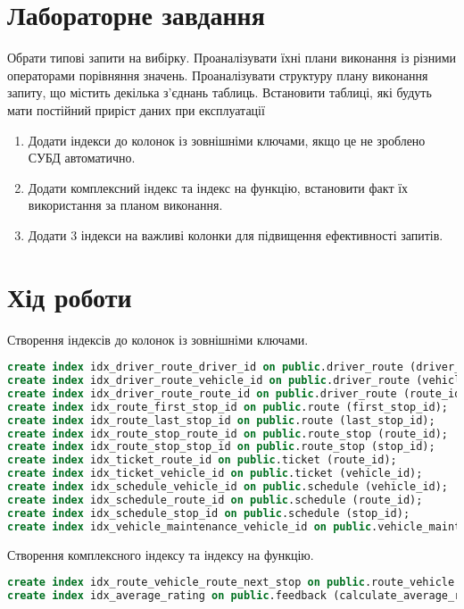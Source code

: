 \documentclass[14pt]{extreport}
\begin{document}
\begin{normalsize}
	\section*{Лабораторне завдання}
	Обрати типові запити на вибірку. Проаналізувати їхні плани виконання із різними операторами порівняння значень. Проаналізувати структуру плану виконання запиту, що містить декілька з’єднань таблиць. Встановити таблиці, які будуть мати постійний приріст даних при експлуатації
	
	\begin{enumerate}
\item Додати індекси до колонок із зовнішніми ключами, якщо це не зроблено СУБД автоматично.
\item Додати комплексний індекс та індекс на функцію, встановити факт їх використання за планом виконання.
\item Додати 3 індекси на важливі колонки для підвищення ефективності запитів.
	\end{enumerate}
	
	\section*{Хід роботи}
	
	Створення індексів до колонок із зовнішніми ключами.
	\begin{small}
		\begin{lstlisting}[language=sql]
create index idx_driver_route_driver_id on public.driver_route (driver_id);
create index idx_driver_route_vehicle_id on public.driver_route (vehicle_id);
create index idx_driver_route_route_id on public.driver_route (route_id);
create index idx_route_first_stop_id on public.route (first_stop_id);
create index idx_route_last_stop_id on public.route (last_stop_id);
create index idx_route_stop_route_id on public.route_stop (route_id);
create index idx_route_stop_stop_id on public.route_stop (stop_id);
create index idx_ticket_route_id on public.ticket (route_id);
create index idx_ticket_vehicle_id on public.ticket (vehicle_id);
create index idx_schedule_vehicle_id on public.schedule (vehicle_id);
create index idx_schedule_route_id on public.schedule (route_id);
create index idx_schedule_stop_id on public.schedule (stop_id);
create index idx_vehicle_maintenance_vehicle_id on public.vehicle_maintenance (vehicle_id);
		\end{lstlisting}
	\end{small}
	
	
	Створення комплексного індексу та індексу на функцію.
	\begin{small}
		\begin{lstlisting}[language=sql]
create index idx_route_vehicle_route_next_stop on public.route_vehicle (route_id, next_stop);
create index idx_average_rating on public.feedback (calculate_average_rating(driver_id));
		\end{lstlisting}
	\end{small}
	

\end{normalsize}
\end{document}
